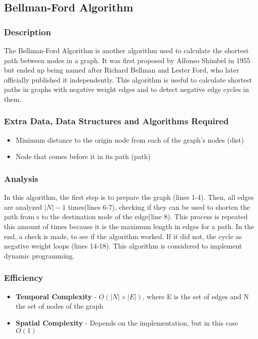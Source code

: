 \subsection{Bellman-Ford Algorithm}

\subsubsection{Description}
The Bellman-Ford Algorithm is another algorithm used to calculate the shortest path between nodes in a graph. It was first proposed by Alfonso Shimbel in 1955 but ended up being named after Richard Bellman and Lester Ford, who later officially published it independently. This algorithm is useful to calculate shortest paths in graphs with negative weight edges and to detect negative edge cycles in them.

\subsubsection{Extra Data, Data Structures and Algorithms Required}
\begin{itemize}
    \item Minimum distance to the origin node from each of the graph's nodes (dist)
    \item Node that comes before it in its path (path)
\end{itemize}



\subsubsection{Analysis}
In this algorithm, the first step is to prepare the graph (lines 1-4). Then, all edges are analyzed $|N| - 1 $ times(lines 6-7), checking if they can be used to shorten the path from s to the destination node of the edge(line 8). This process is repeated this amount of times because it is the maximum length in edges for a path. In the end, a check is made, to see if the algorithm worked. If it did not, the cycle as negative weight loops (lines 14-18). This algorithm is considered to implement dynamic programming.

\subsubsection{Efficiency}
\begin{itemize}
    \item \textbf{Temporal Complexity} - $ O(|N| \times |E|) $, where E is the set of edges and N the set of nodes of the graph
    \item \textbf{Spatial Complexity} - Depends on the implementation, but in this case $ O(1) $
\end{itemize}

